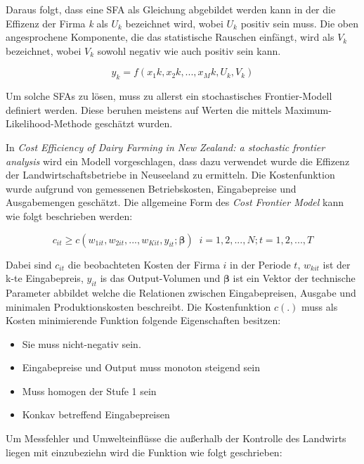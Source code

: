 Daraus folgt, dass eine SFA als Gleichung abgebildet werden kann in der die Effizenz der Firma \textit{k} als $U_k$ bezeichnet wird, wobei $U_k$ positiv sein muss. Die oben angesprochene Komponente, die das statistische Rauschen einfängt, wird als $V_k$ bezeichnet, wobei $V_k$ sowohl negativ wie auch positiv sein kann.\cite{jour:Cullinane2006}

\begin{equation}\label{eq:sfadef}
	y_k = f(x_1k,x_2k,...,x_Mk,U_k,V_k)
\end{equation}

Um solche SFAs zu lösen, muss zu allerst ein stochastisches Frontier-Modell definiert werden. Diese beruhen meistens auf Werten die mittels Maximum-Likelihood-Methode geschätzt wurden.

In \textit{Cost Efficiency of Dairy Farming in New Zealand: a stochastic frontier analysis}\cite{conf:Jian2013} wird ein Modell vorgeschlagen, dass dazu verwendet wurde die Effizenz der Landwirtschaftsbetriebe in Neuseeland zu ermitteln. Die Kostenfunktion wurde aufgrund von gemessenen Betriebskosten, Eingabepreise und Ausgabemengen geschätzt. Die allgemeine Form des \textit{Cost Frontier Model} kann wie folgt beschrieben werden:

\begin{equation}
	c_{it} \geq c(w_{1it}, w_{2it},...,w_{Kit},y_{it};\boldsymbol{\beta}) \;\; i=1,2,...,N;t=1,2,...,T
\end{equation}

Dabei sind $c_{it}$ die beobachteten Kosten der Firma $i$ in der Periode $t$, $w_{kit}$ ist der k-te Eingabepreis, $y_{it}$ is das Output-Volumen und $\boldsymbol{\beta}$ ist ein Vektor der technische Parameter abbildet welche die Relationen zwischen Eingabepreisen, Ausgabe und minimalen Produktionskosten beschreibt. Die Kostenfunktion $c(.)$ muss als Kosten minimierende Funktion folgende Eigenschaften besitzen:
\begin{itemize}
	\item Sie muss nicht-negativ sein.
	\item Eingabepreise und Output muss monoton steigend sein
	\item Muss homogen der Stufe 1 sein
	\item Konkav betreffend Eingabepreisen
\end{itemize}

Um Messfehler und Umwelteinflüsse die außerhalb der Kontrolle des Landwirts liegen mit einzubeziehn wird die Funktion wie folgt geschrieben:

